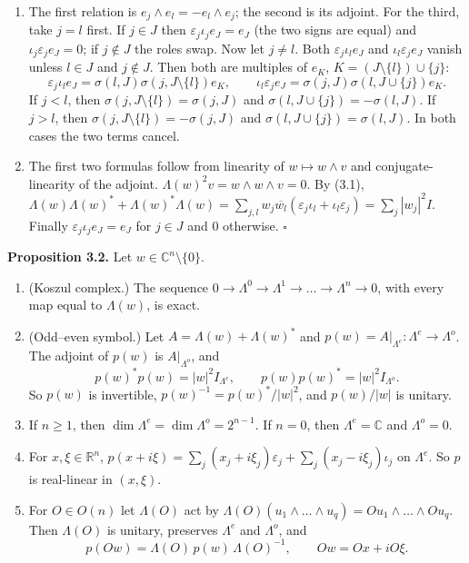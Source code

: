 \documentclass[
  11pt,
]{article}
\providecommand{\tightlist}{%
  \setlength{\itemsep}{0pt}\setlength{\parskip}{0pt}}
\begin{document}
\begin{enumerate}
\def\labelenumi{(\arabic{enumi})}
\setcounter{enumi}{1}
\item
  The first relation is \(e_j\wedge e_l=-e_l\wedge e_j\); the second is
  its adjoint. For the third, take \(j=l\) first. If \(j\in J\) then
  \(\varepsilon_j\iota_je_J=e_J\) (the two signs are equal) and
  \(\iota_j\varepsilon_je_J=0\); if \(j\notin J\) the roles swap. Now
  let \(j\ne l\). Both \(\varepsilon_j\iota_le_J\) and
  \(\iota_l\varepsilon_je_J\) vanish unless \(l\in J\) and
  \(j\notin J\). Then both are multiples of \(e_K\),
  \(K=(J\setminus\{l\})\cup\{j\}\): \[
\varepsilon_j\iota_le_J=\sigma(l,J)\sigma(j,J\setminus\{l\})e_K,\qquad
\iota_l\varepsilon_je_J=\sigma(j,J)\sigma(l,J\cup\{j\})e_K .
\] If \(j<l\), then \(\sigma(j,J\setminus\{l\})=\sigma(j,J)\) and
  \(\sigma(l,J\cup\{j\})=-\sigma(l,J)\). If \(j>l\), then
  \(\sigma(j,J\setminus\{l\})=-\sigma(j,J)\) and
  \(\sigma(l,J\cup\{j\})=\sigma(l,J)\). In both cases the two terms
  cancel.
\item
  The first two formulas follow from linearity of \(w\mapsto w\wedge v\)
  and conjugate-linearity of the adjoint.
  \(\Lambda(w)^2v=w\wedge w\wedge v=0\). By (3.1),
  \(\Lambda(w)\Lambda(w)^*+\Lambda(w)^*\Lambda(w)=\sum_{j,l}w_j\overline{w_l}(\varepsilon_j\iota_l+\iota_l\varepsilon_j)=\sum_j|w_j|^2I\).
  Finally \(\varepsilon_j\iota_je_J=e_J\) for \(j\in J\) and \(0\)
  otherwise. \(\square\)
\end{enumerate}

\textbf{Proposition 3.2.} Let \(w\in\mathbb C^n\setminus\{0\}\).

\begin{enumerate}
\def\labelenumi{\arabic{enumi}.}
\tightlist
\item
  (Koszul complex.) The sequence
  \(0\to\Lambda^0\to\Lambda^1\to\dots\to\Lambda^n\to0\), with every map
  equal to \(\Lambda(w)\), is exact.
\item
  (Odd--even symbol.) Let \(A=\Lambda(w)+\Lambda(w)^*\) and
  \(p(w)=A|_{\Lambda^e}:\Lambda^e\to\Lambda^o\). The adjoint of \(p(w)\)
  is \(A|_{\Lambda^o}\), and \[
p(w)^*p(w)=|w|^2I_{\Lambda^e},\qquad p(w)p(w)^*=|w|^2I_{\Lambda^o}.
\tag{3.3}
\] So \(p(w)\) is invertible, \(p(w)^{-1}=p(w)^*/|w|^2\), and
  \(p(w)/|w|\) is unitary.
\item
  If \(n\ge1\), then \(\dim\Lambda^e=\dim\Lambda^o=2^{n-1}\). If
  \(n=0\), then \(\Lambda^e=\mathbb C\) and \(\Lambda^o=0\).
\item
  For \(x,\xi\in\mathbb R^n\),
  \(p(x+i\xi)=\sum_j(x_j+i\xi_j)\varepsilon_j+\sum_j(x_j-i\xi_j)\iota_j\)
  on \(\Lambda^e\). So \(p\) is real-linear in \((x,\xi)\).
\item
  For \(O\in O(n)\) let \(\Lambda(O)\) act by
  \(\Lambda(O)(u_1\wedge\dots\wedge u_q)=Ou_1\wedge\dots\wedge Ou_q\).
  Then \(\Lambda(O)\) is unitary, preserves \(\Lambda^e\) and
  \(\Lambda^o\), and \[
p(Ow)=\Lambda(O)\,p(w)\,\Lambda(O)^{-1},\qquad Ow=Ox+iO\xi .
\tag{3.4}
\]
\end{enumerate}
\end{document}
